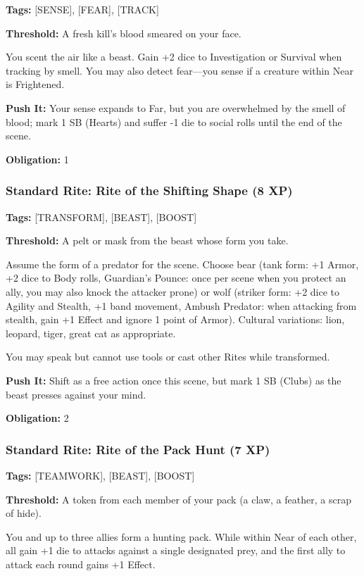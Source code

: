 \textbf{Tags:} [SENSE], [FEAR], [TRACK]

\textbf{Threshold:} A fresh kill's blood smeared on your face.

You scent the air like a beast. Gain +2 dice to Investigation or Survival when tracking by smell. You may also detect fear—you sense if a creature within Near is Frightened.

\textbf{Push It:} Your sense expands to Far, but you are overwhelmed by the smell of blood; mark 1 SB (Hearts) and suffer -1 die to social rolls until the end of the scene.

\textbf{Obligation:} 1

\subsubsection{Standard Rite: Rite of the Shifting Shape (8 XP)}

\textbf{Tags:} [TRANSFORM], [BEAST], [BOOST]

\textbf{Threshold:} A pelt or mask from the beast whose form you take.

Assume the form of a predator for the scene. Choose bear (tank form: +1 Armor, +2 dice to Body rolls, Guardian's Pounce: once per scene when you protect an ally, you may also knock the attacker prone) or wolf (striker form: +2 dice to Agility and Stealth, +1 band movement, Ambush Predator: when attacking from stealth, gain +1 Effect and ignore 1 point of Armor). Cultural variations: lion, leopard, tiger, great cat as appropriate.

You may speak but cannot use tools or cast other Rites while transformed.

\textbf{Push It:} Shift as a free action once this scene, but mark 1 SB (Clubs) as the beast presses against your mind.

\textbf{Obligation:} 2

\subsubsection{Standard Rite: Rite of the Pack Hunt (7 XP)}

\textbf{Tags:} [TEAMWORK], [BEAST], [BOOST]

\textbf{Threshold:} A token from each member of your pack (a claw, a feather, a scrap of hide).

You and up to three allies form a hunting pack. While within Near of each other, all gain +1 die to attacks against a single designated prey, and the first ally to attack each round gains +1 Effect.

